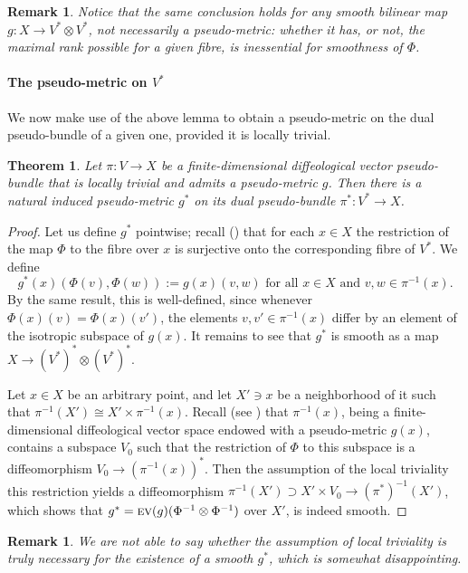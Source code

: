 \documentclass{article}
\newtheorem{thm}[lemma]{Theorem}
\newtheorem{rem}[lemma]{Remark}
\begin{document}
\begin{rem}
Notice that the same conclusion holds for any smooth bilinear map $g:X\to V^*\otimes V^*$, not necessarily a pseudo-metric: whether it has, or not, the maximal rank possible for a given fibre, is inessential 
for smoothness of $\Phi$.
\end{rem}

\paragraph{The pseudo-metric on $V^*$} We now make use of the above lemma to obtain a pseudo-metric on the dual pseudo-bundle of a given one, provided it is locally trivial.

\begin{thm}\label{metric:on:dual:simult:thm}
Let $\pi:V\to X$ be a finite-dimensional diffeological vector pseudo-bundle that is locally trivial and admits a pseudo-metric $g$. Then there is a natural induced pseudo-metric $g^*$ on its dual pseudo-bundle 
$\pi^*:V^*\to X$.
\end{thm}

\begin{proof}
Let us define $g^*$ pointwise; recall (\cite{pseudometric}) that for each $x\in X$ the restriction of the map $\Phi$ to the fibre over $x$ is surjective onto the corresponding fibre of $V^*$. We define
$$g^*(x)(\Phi(v),\Phi(w)):=g(x)(v,w)\mbox{ for all }x\in X\mbox{ and }v,w\in\pi^{-1}(x).$$ By the same result, this is well-defined, since whenever $\Phi(x)(v)=\Phi(x)(v')$, the elements $v,v'\in\pi^{-1}(x)$ differ
by an element of the isotropic subspace of $g(x)$. It remains to see that $g^*$ is smooth as a map $X\to(V^*)^*\otimes(V^*)^*$.

Let $x\in X$ be an arbitrary point, and let $X'\ni x$ be a neighborhood of it such that $\pi^{-1}(X')\cong X'\times\pi^{-1}(x)$. Recall (see \cite{pseudometric}) that $\pi^{-1}(x)$, being a finite-dimensional 
diffeological vector space endowed with a pseudo-metric $g(x)$, contains a subspace $V_0$ such that the restriction of $\Phi$ to this subspace is a diffeomorphism $V_0\to(\pi^{-1}(x))^*$. Then the assumption 
of the local triviality this restriction yields a diffeomorphism $\pi^{-1}(X')\supset X'\times V_0\to(\pi^*)^{-1}(X')$, which shows that $g^*=\mbox{\textsc{ev}}(g)(\Phi^{-1}\otimes\Phi^{-1})$ over $X'$, is indeed 
smooth.
\end{proof}

\begin{rem}
We are not able to say whether the assumption of local triviality is truly necessary for the existence of a smooth $g^*$, which is somewhat disappointing. 
\end{rem}
\end{document}
